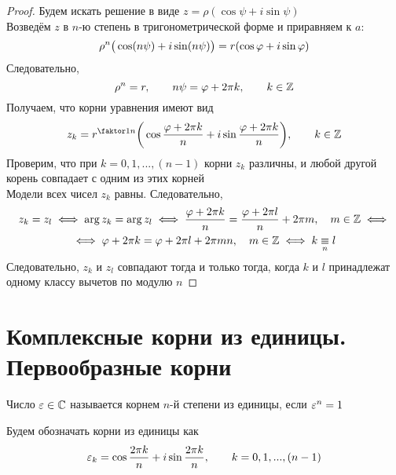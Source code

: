 \begin{proof}
	Будем искать решение в виде $z = \rho(\cos \psi + i \sin \psi)$ \\
	Возведём $z$ в $n$-ю степень в тригонометрической форме и приравняем к $a$:
	$$ \rho^n \big( \cos(n\psi) + i \sin(n\psi) \big) = r(\cos \varphi + i \sin \varphi) $$
	Следовательно,
	$$ \rho^n = r, \qquad n\psi = \varphi + 2\pi k, \qquad k \in \mathbb{Z} $$
	Получаем, что корни уравнения имеют вид
	$$ z_k = r^{\faktor1n} \bigg( \cos \frac{\vphi + 2\pi k}n + i \sin \frac{\vphi + 2\pi k}n \bigg), \qquad k \in \Z $$
	Проверим, что при $k = 0, 1, ..., (n - 1)$ корни $z_k$ различны, и любой другой корень совпадает с одним из этих корней \\
	Модели всех чисел $z_k$ равны. Следовательно,
	\begin{multline*}
		z_k = z_l \iff \arg z_k = \arg z_l \iff \frac{\varphi + 2\pi k}n = \frac{\varphi + 2\pi l}n + 2\pi m, \quad m \in \mathbb{Z} \iff \\ \iff \varphi + 2\pi k = \varphi + 2\pi l + 2\pi mn, \quad m \in \mathbb{Z} \iff k \underset{n}{\equiv} l
	\end{multline*}
	Следовательно, $z_k$ и $z_l$ совпадают тогда и только тогда, когда $k$ и $l$ принадлежат одному классу вычетов по модулю $n$
\end{proof}

\section{Комплексные корни из единицы. Первообразные корни}

\begin{definition}
	Число $\varepsilon \in \mathbb{C}$ называется корнем $n$-й степени из единицы, если $\varepsilon^n = 1 $
\end{definition}

\begin{notation}
	Будем обозначать корни из единицы как
	$$ \varepsilon_k = \cos \frac{2\pi k}n + i \sin \frac{2\pi k}n, \qquad k = 0, 1, ..., (n - 1) $$
\end{notation}

